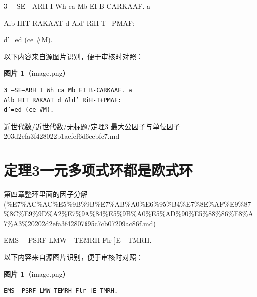 \begin{theorem}[定理3 最大公因子与单位因子]

3 —SE—ARH I Wh ca Mb EI B-CARKAAF. a

Alb HIT RAKAAT d Ald’ RiH-T+PMAF:

d’=ed (ce \#M).

\end{theorem}

\begin{note}
以下内容来自源图片识别，便于审核时对照：

\textbf{图片 1}（image.png）
\begin{Verbatim}[fontsize=\small]
3 —SE—ARH I Wh ca Mb EI B-CARKAAF. a
Alb HIT RAKAAT d Ald’ RiH-T+PMAF:
d’=ed (ce #M).
\end{Verbatim}

\end{note}

\begin{note}[来源路径]

近世代数/近世代数/无标题/定理3 最大公因子与单位因子 203d2efa3f428022b1aefef6d6ccbfc7.md

\end{note}

\section*{定理3一元多项式环都是欧式环}

\begin{note}[来源上级主题]

第四章整环里面的因子分解 (\%E7\%AC\%AC\%E5\%9B\%9B\%E7\%AB\%A0\%E6\%95\%B4\%E7\%8E\%AF\%E9\%87\%8C\%E9\%9D\%A2\%E7\%9A\%84\%E5\%9B\%A0\%E5\%AD\%90\%E5\%88\%86\%E8\%A7\%A3\%20202d2efa3f42807695c7cb07209ac86f.md)

\end{note}

\begin{theorem}[定理3一元多项式环都是欧式环]

EMS —PSRF LMW—TEMRH Flr ]E—TMRH.

\end{theorem}

\begin{note}
以下内容来自源图片识别，便于审核时对照：

\textbf{图片 1}（image.png）
\begin{Verbatim}[fontsize=\small]
EMS —PSRF LMW—TEMRH Flr ]E—TMRH.
\end{Verbatim}

\end{note}

